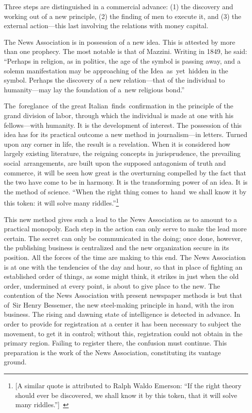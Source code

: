\documentclass[twoside,symmetric,nobib,justified]{tufte-book}
\begin{document}
Three steps are distinguished in a commercial advance: (1) the discovery
and working out of a new principle, (2) the finding of men to execute
it, and (3) the external action---this last involving the relations with
money capital.~

The News Association is in possession of a new idea. This is attested by
more than one prophecy. The most notable is that of Mazzini. Writing in
1849, he said: ``Perhaps in religion, as in politics, the age of the
symbol is passing away, and a solemn manifestation may be approaching of
the Idea~as~yet~hidden in the symbol. Perhaps the discovery of a new
relation---that of the individual to humanity---may lay the foundation
of a~new religious bond.''

The~foreglance~of the great Italian~finds~confirmation in the principle
of the grand division of labor, through which the individual is made at
one with his fellows---with humanity. It is the development of interest.
The possession of this idea has for its practical outcome a new method
in journalism---in letters. Turned upon any corner in life, the result
is a revelation. When it is considered how largely existing literature,
the reigning concepts in jurisprudence, the prevailing
social~arrangements, are built upon the supposed antagonism of truth and
commerce, it will be seen how great is the overturning compelled by the
fact that the two have come to be in harmony. It is the transforming
power of an idea. It is the method of science. ``When the right thing
comes to~hand~we shall know it by this token: it will solve many
riddles.''\footnote{{[}A similar quote is attributed to Ralph Waldo
  Emerson: ``If the right theory should ever be discovered, we shall
  know it by this token, that it will solve many
  riddles.''\href{applewebdata://D02306DF-3E46-4684-BD1A-1A323FFB2CB2\#_msocom_1}{{]}}~}~

This new method gives such a lead to the News Association as to amount
to a practical monopoly. Each step in the action can only serve to make
the lead more certain. The secret can only be communicated in the doing;
once done, however, the publishing business is centralized and the new
organization secure in its position. All the forces of the time are
making to this end. The News Association is at one with the tendencies
of the day and hour, so that in place of fighting an established order
of things, as some might think, it strikes in just when the old order,
undermined at every point, is about to give place to the new. The
contention of the News Association with present newspaper methods is but
that of~Sir Henry Bessemer, the new steel-making principle in hand, with
the iron business. The rising and dawning state of intelligence is
detected in advance. In order to provide for registration at a center it
has been necessary to subject the movement, to get it in control;
without this, registration could not obtain in the primary region.
Failing to register there, the confusion must continue. This preparation
is the work of the News Association, constituting its vantage ground.~
\end{document}
